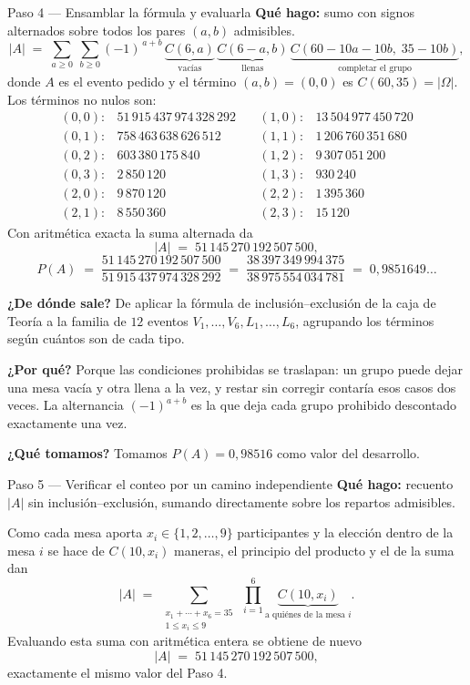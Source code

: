 \documentclass[11pt]{article}
\begin{document}
\begin{sol}
\begin{paso}{Paso 4 --- Ensamblar la f\'ormula y evaluarla}
\textbf{Qu\'e hago:} sumo con signos alternados sobre todos los pares $(a,b)$ admisibles.
\[
|A| \;=\; \sum_{a\ge 0}\ \sum_{b\ge 0} (-1)^{\,a+b}\,
\underbrace{C(6,a)}_{\text{vac\'ias}}\,\underbrace{C(6-a,b)}_{\text{llenas}}\,\underbrace{C(60-10a-10b,\;35-10b)}_{\text{completar el grupo}} ,
\]
donde $A$ es el evento pedido y el t\'ermino $(a,b)=(0,0)$ es $C(60,35)=|\Omega|$. Los t\'erminos no nulos son:
\[
\begin{array}{llll}
(0,0)\!: & 51\,915\,437\,974\,328\,292 &\quad (1,0)\!: & 13\,504\,977\,450\,720\\
(0,1)\!: & 758\,463\,638\,626\,512 &\quad (1,1)\!: & 1\,206\,760\,351\,680\\
(0,2)\!: & 603\,380\,175\,840 &\quad (1,2)\!: & 9\,307\,051\,200\\
(0,3)\!: & 2\,850\,120 &\quad (1,3)\!: & 930\,240\\
(2,0)\!: & 9\,870\,120 &\quad (2,2)\!: & 1\,395\,360\\
(2,1)\!: & 8\,550\,360 &\quad (2,3)\!: & 15\,120
\end{array}
\]
Con aritm\'etica exacta la suma alternada da
\[
|A| \;=\; 51\,145\,270\,192\,507\,500 ,
\]
\[
P(A)\;=\;\frac{51\,145\,270\,192\,507\,500}{51\,915\,437\,974\,328\,292}
\;=\;\frac{38\,397\,349\,994\,375}{38\,975\,554\,034\,781}\;=\;0{,}9851649\ldots
\]

\textbf{¿De d\'onde sale?} De aplicar la f\'ormula de inclusi\'on--exclusi\'on de la caja de Teor\'ia a la familia de $12$ eventos $V_1,\dots,V_6,L_1,\dots,L_6$, agrupando los t\'erminos seg\'un cu\'antos son de cada tipo.

\textbf{¿Por qu\'e?} Porque las condiciones prohibidas se traslapan: un grupo puede dejar una mesa vac\'ia y otra llena a la vez, y restar sin corregir contar\'ia esos casos dos veces. La alternancia $(-1)^{a+b}$ es la que deja cada grupo prohibido descontado exactamente una vez.

\textbf{¿Qu\'e tomamos?} Tomamos $P(A)=0{,}98516$ como valor del desarrollo.
\end{paso}

\begin{paso}{Paso 5 --- Verificar el conteo por un camino independiente}
\textbf{Qu\'e hago:} recuento $|A|$ sin inclusi\'on--exclusi\'on, sumando directamente sobre los repartos admisibles.

Como cada mesa aporta $x_i\in\{1,2,\dots,9\}$ participantes y la elecci\'on dentro de la mesa $i$ se hace de $C(10,x_i)$ maneras, el principio del producto y el de la suma dan
\[
|A| \;=\; \sum_{\substack{x_1+\cdots+x_6=35\\ 1\le x_i\le 9}}\ \prod_{i=1}^{6}\underbrace{C(10,x_i)}_{\text{a qui\'enes de la mesa }i} .
\]
Evaluando esta suma con aritm\'etica entera se obtiene de nuevo
\[
|A| \;=\; 51\,145\,270\,192\,507\,500 ,
\]
exactamente el mismo valor del Paso 4.


\end{paso}
\end{sol}
\end{document}
